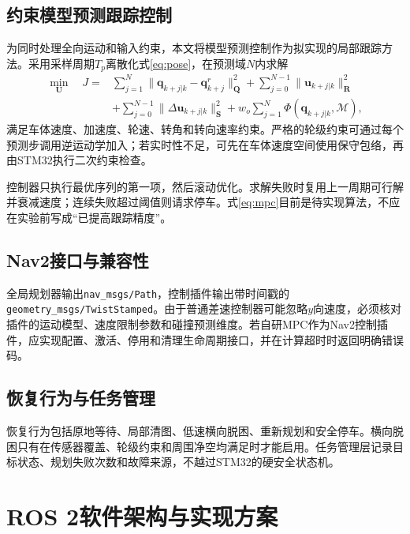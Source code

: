 \documentclass[UTF8,openany,12pt,a4paper]{ctexrep}
\begin{document}
\section{约束模型预测跟踪控制}
为同时处理全向运动和输入约束，本文将模型预测控制作为拟实现的局部跟踪方法。采用采样周期$T_p$离散化式\eqref{eq:pose}，在预测域$N$内求解
\begin{align}
\min_{\bm U}\quad J={}&\sum_{j=1}^{N}\|\bm q_{k+j|k}-\bm q_{k+j}^r\|_{\bm Q}^2
+\sum_{j=0}^{N-1}\|\bm u_{k+j|k}\|_{\bm R}^2\\
&+\sum_{j=0}^{N-1}\|\Delta\bm u_{k+j|k}\|_{\bm S}^2
+w_o\sum_{j=1}^{N}\Phi(\bm q_{k+j|k},\mathcal M),
\label{eq:mpc}
\end{align}
满足车体速度、加速度、轮速、转角和转向速率约束。严格的轮级约束可通过每个预测步调用逆运动学加入；若实时性不足，可先在车体速度空间使用保守包络，再由STM32执行二次约束检查。

控制器只执行最优序列的第一项，然后滚动优化。求解失败时复用上一周期可行解并衰减速度；连续失败超过阈值则请求停车。式\eqref{eq:mpc}目前是待实现算法，不应在实验前写成“已提高跟踪精度”。

\section{Nav2接口与兼容性}
全局规划器输出\texttt{nav\_msgs/Path}，控制插件输出带时间戳的\texttt{geometry\_msgs/TwistStamped}。由于普通差速控制器可能忽略$y$向速度，必须核对插件的运动模型、速度限制参数和碰撞预测维度。若自研MPC作为Nav2控制插件，应实现配置、激活、停用和清理生命周期接口，并在计算超时时返回明确错误码。

\section{恢复行为与任务管理}
恢复行为包括原地等待、局部清图、低速横向脱困、重新规划和安全停车。横向脱困只有在传感器覆盖、轮级约束和周围净空均满足时才能启用。任务管理层记录目标状态、规划失败次数和故障来源，不越过STM32的硬安全状态机。

\chapter{ROS 2软件架构与实现方案}
\end{document}
